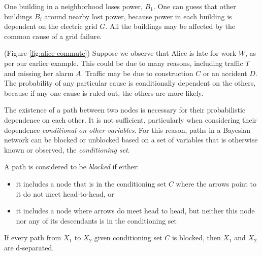\documentclass[../thesis.tex]{subfiles}
\begin{document}
\begin{exm}
  One building in a neighborhood loses power, $B_1$.
  One can guess that other buildings $B_i$ around nearby lost power,
  because power in each building is dependent on the electric grid
  $G$. All the buildings may be affected by the common cause of a grid
  failure.
\end{exm}
\begin{center}
\end{center}

\begin{exm}(Figure \ref{fig:alice-commute})
  Suppose we observe that Alice is late for work $W$, as per our
  earlier example. This could be due to many reasons,
  including traffic $T$ and missing her alarm $A$.
  Traffic may be due to construction $C$ or an accident $D$.
  The probability of any particular cause is conditionally
  dependent on the others, because if any one cause is
  ruled out, the others are more likely.
\end{exm}

The existence of a path between two nodes is
necessary for their probabilistic dependence on each other.
It is not sufficient, particularly when considering
their dependence \emph{conditional on other variables}.
For this reason, paths in a Bayesian network can be
blocked or unblocked based on a set of variables that is
otherwise known or observed, the \emph{conditioning set}.


\begin{dfn}
A path is considered to be \emph{blocked} if either:
\begin{itemize}
\item it includes a node that is in the conditioning set \(C\) 
where the arrows point to it do not meet head-to-head, or
\item it includes a node where arrows do meet head to head, but
neither this node nor any of its descendants is in the
conditioning set
\end{itemize}
\end{dfn}

\begin{dfn}[D-separation]
If every path from \(X_1\) to \(X_2\) given conditioning set \(C\)
is blocked, then \(X_1\) and \(X_2\) are d-separated.
\end{dfn}
\end{document}
